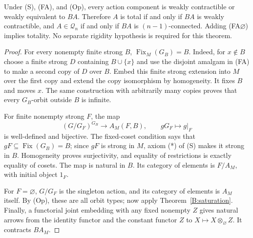 \begin{theorem}
\label{B:op-total}
Under (S), (FA), and (Op), every action component is weakly
contractible or weakly equivalent to $BA$. Therefore $A$ is total
if and only if $BA$ is weakly contractible, and $A\in\mathcal Q_n$
if and only if $BA$ is $(n-1)$-connected. Adding (FA$\varnothing$)
implies totality. No separate rigidity hypothesis is required for
this theorem.
\end{theorem}
\begin{proof}
For every nonempty finite strong $B$,
$\operatorname{Fix}_M(G_B)=B$. Indeed, for $x\notin B$ choose a
finite strong $D$ containing $B\cup\{x\}$ and use the disjoint
amalgam in (FA) to make a second copy of $D$ over $B$. Embed this
finite strong extension into $M$ over the first copy and extend
the copy isomorphism by homogeneity. It fixes $B$ and moves $x$.
The same construction with arbitrarily many copies proves that
every $G_B$-orbit outside $B$ is infinite.

For finite nonempty strong $F$, the map
\[
 (G/G_F)^{G_B}\longrightarrow A_M(F,B),\qquad gG_F\longmapsto g|_F
\]
is well-defined and bijective. The fixed-coset condition says that
$gF\subseteq\operatorname{Fix}(G_B)=B$; since $gF$ is strong in
$M$, axiom (*) of (S) makes it strong in $B$. Homogeneity proves
surjectivity, and equality of restrictions is exactly equality of
cosets. The map is natural in $B$. Its category of elements is
$F/A_M$, with initial object $1_F$.

For $F=\varnothing$, $G/G_F$ is the singleton action, and its category
of elements is $A_M$ itself. By (Op), these are all orbit types; now
apply Theorem~\ref{B:saturation}. Finally, a functorial joint
embedding with any fixed nonempty $Z$ gives natural arrows from
the identity functor and the constant functor $Z$ to
$X\mapsto X\otimes_\varnothing Z$. It contracts $BA_M$.
\end{proof}

